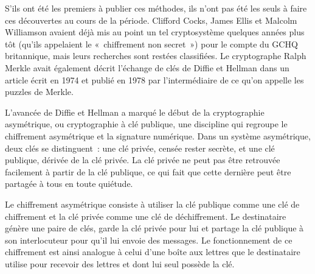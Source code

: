 S'ils ont été les premiers à publier ces méthodes, ils n'ont pas été les seuls à faire ces découvertes au cours de la période. Clifford Cocks, James Ellis et Malcolm Williamson avaient déjà mis au point un tel cryptosystème quelques années plus tôt (qu'ils appelaient le «~chiffrement non secret~») pour le compte du GCHQ britannique, mais leurs recherches sont restées classifiées. Le cryptographe Ralph Merkle avait également décrit l'échange de clés de Diffie et Hellman dans un article écrit en 1974 et publié en 1978 par l'intermédiaire de ce qu'on appelle les puzzles de Merkle.

L'avancée de Diffie et Hellman a marqué le début de la cryptographie asymétrique, ou cryptographie à clé publique, une discipline qui regroupe le chiffrement asymétrique et la signature numérique. Dans un système asymétrique, deux clés se distinguent~: une clé privée, censée rester secrète, et une clé publique, dérivée de la clé privée. La clé privée ne peut pas être retrouvée facilement à partir de la clé publique, ce qui fait que cette dernière peut être partagée à tous en toute quiétude.

Le chiffrement asymétrique consiste à utiliser la clé publique comme une clé de chiffrement et la clé privée comme une clé de déchiffrement. Le destinataire génère une paire de clés, garde la clé privée pour lui et partage la clé publique à son interlocuteur pour qu'il lui envoie des messages. Le fonctionnement de ce chiffrement est ainsi analogue à celui d'une boîte aux lettres que le destinataire utilise pour recevoir des lettres et dont lui seul possède la clé.

